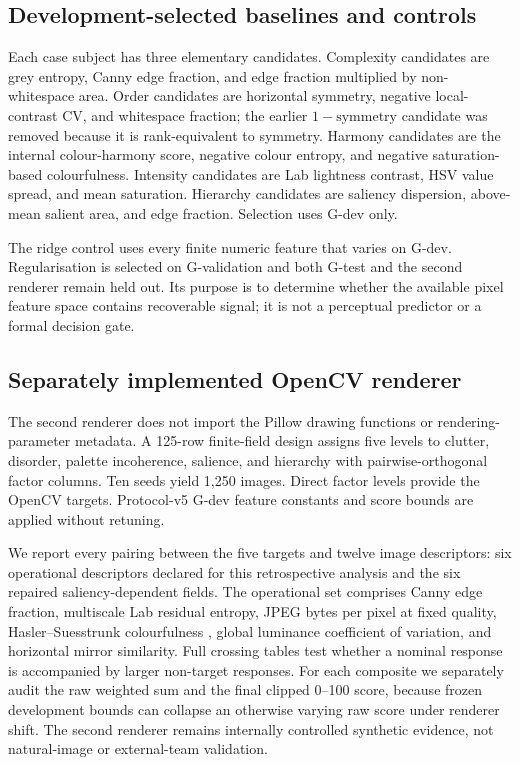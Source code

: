 \subsection{Development-selected baselines and controls}

Each case subject has three elementary candidates. Complexity candidates are grey entropy, Canny edge fraction, and edge fraction multiplied by non-whitespace area. Order candidates are horizontal symmetry, negative local-contrast CV, and whitespace fraction; the earlier $1-\mathrm{symmetry}$ candidate was removed because it is rank-equivalent to symmetry. Harmony candidates are the internal colour-harmony score, negative colour entropy, and negative saturation-based colourfulness. Intensity candidates are Lab lightness contrast, HSV value spread, and mean saturation. Hierarchy candidates are saliency dispersion, above-mean salient area, and edge fraction. Selection uses G-dev only.

The ridge control uses every finite numeric feature that varies on G-dev. Regularisation is selected on G-validation and both G-test and the second renderer remain held out. Its purpose is to determine whether the available pixel feature space contains recoverable signal; it is not a perceptual predictor or a formal decision gate.

\subsection{Separately implemented OpenCV renderer}

The second renderer does not import the Pillow drawing functions or rendering-parameter metadata. A 125-row finite-field design assigns five levels to clutter, disorder, palette incoherence, salience, and hierarchy with pairwise-orthogonal factor columns. Ten seeds yield 1,250 images. Direct factor levels provide the OpenCV targets. Protocol-v5 G-dev feature constants and score bounds are applied without retuning.

We report every pairing between the five targets and twelve image descriptors: six operational descriptors declared for this retrospective analysis and the six repaired saliency-dependent fields. The operational set comprises Canny edge fraction, multiscale Lab residual entropy, JPEG bytes per pixel at fixed quality, Hasler--Suesstrunk colourfulness \citep{hasler2003colourfulness}, global luminance coefficient of variation, and horizontal mirror similarity. Full crossing tables test whether a nominal response is accompanied by larger non-target responses. For each composite we separately audit the raw weighted sum and the final clipped 0--100 score, because frozen development bounds can collapse an otherwise varying raw score under renderer shift. The second renderer remains internally controlled synthetic evidence, not natural-image or external-team validation.

